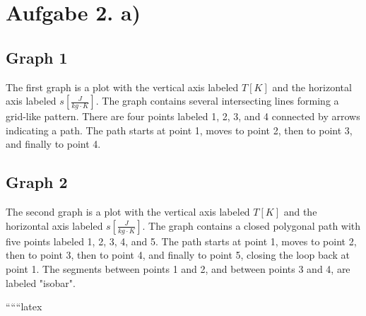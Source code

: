 \section*{Aufgabe 2. a)}

\subsection*{Graph 1}

The first graph is a plot with the vertical axis labeled \( T [K] \) and the horizontal axis labeled \( s \left[ \frac{J}{kg \cdot K} \right] \). The graph contains several intersecting lines forming a grid-like pattern. There are four points labeled 1, 2, 3, and 4 connected by arrows indicating a path. The path starts at point 1, moves to point 2, then to point 3, and finally to point 4. 

\subsection*{Graph 2}

The second graph is a plot with the vertical axis labeled \( T [K] \) and the horizontal axis labeled \( s \left[ \frac{J}{kg \cdot K} \right] \). The graph contains a closed polygonal path with five points labeled 1, 2, 3, 4, and 5. The path starts at point 1, moves to point 2, then to point 3, then to point 4, and finally to point 5, closing the loop back at point 1. The segments between points 1 and 2, and between points 3 and 4, are labeled "isobar".

``````latex